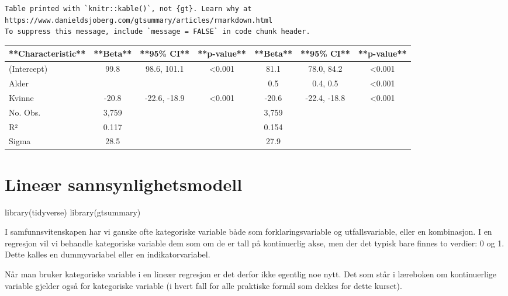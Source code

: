 \documentclass[
  letterpaper,
  DIV=11,
  numbers=noendperiod]{scrreprt}
\newenvironment{Shaded}{\begin{snugshade}}{\end{snugshade}}
\newcommand{\FunctionTok}[1]{\textcolor[rgb]{0.28,0.35,0.67}{#1}}
\newcommand{\NormalTok}[1]{\textcolor[rgb]{0.00,0.23,0.31}{#1}}
\theoremstyle{definition}
\theoremstyle{remark}
\begin{document}
\begin{verbatim}
Table printed with `knitr::kable()`, not {gt}. Learn why at
https://www.danieldsjoberg.com/gtsummary/articles/rmarkdown.html
To suppress this message, include `message = FALSE` in code chunk header.
\end{verbatim}

\begin{tabular}{l|c|c|c|c|c|c}
\hline
**Characteristic** & **Beta** & **95\% CI** & **p-value** & **Beta** & **95\% CI** & **p-value**\\
\hline
(Intercept) & 99.8 & 98.6, 101.1 & <0.001 & 81.1 & 78.0, 84.2 & <0.001\\
\hline
Alder &  &  &  & 0.5 & 0.4, 0.5 & <0.001\\
\hline
Kvinne & -20.8 & -22.6, -18.9 & <0.001 & -20.6 & -22.4, -18.8 & <0.001\\
\hline
No. Obs. & 3,759 &  &  & 3,759 &  & \\
\hline
R² & 0.117 &  &  & 0.154 &  & \\
\hline
Sigma & 28.5 &  &  & 27.9 &  & \\
\hline
\end{tabular}

\hypertarget{lineuxe6r-sannsynlighetsmodell}{%
\chapter{Lineær
sannsynlighetsmodell}\label{lineuxe6r-sannsynlighetsmodell}}

\begin{Shaded}
\begin{Highlighting}[]
\FunctionTok{library}\NormalTok{(tidyverse)}
\FunctionTok{library}\NormalTok{(gtsummary)}
\end{Highlighting}
\end{Shaded}

I samfunnsvitenskapen har vi ganske ofte kategoriske variable både som
forklaringsvariable og utfallsvariable, eller en kombinasjon. I en
regresjon vil vi behandle kategoriske variable dem som om de er tall på
kontinuerlig akse, men der det typisk bare finnes to verdier: 0 og 1.
Dette kalles en dummyvariabel eller en indikatorvariabel.

Når man bruker kategoriske variable i en lineær regresjon er det derfor
ikke egentlig noe nytt. Det som står i læreboken om kontinuerlige
variable gjelder også for kategoriske variable (i hvert fall for alle
praktiske formål som dekkes for dette kurset).
\end{document}
